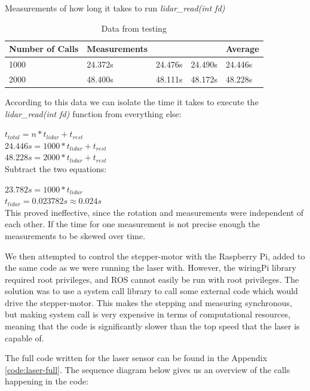 Measurements of how long it takes to run \textit{lidar\_read(int fd)}

\begin{table}[H]
	\centering
	\begin{tabular}{|l|l|l|l|l|} \hline
            Number of Calls & Measurements & & & Average \\ \hline
            1000 & 24.372s & 24.476s & 24.490s & 24.446s \\ \hline
            2000 & 48.400s & 48.111s & 48.172s & 48.228s \\ \hline
	\end{tabular}
	\caption{Data from testing}
\end{table}

According to this data we can isolate the time it takes to execute the \textit{lidar\_read(int fd)} function from everything else:

$t_{total} = n*t_{lidar} + t_{rest}$ \\

$24.446s = 1000*t_{lidar} + t_{rest}$ \\
$48.228s = 2000*t_{lidar} + t_{rest}$ \\

Subtract the two equations:

$23.782s = 1000*t_{lidar}$ \\
$t_{lidar} = 0.023782s \approx 0.024s$ \\


This proved ineffective, since the rotation and measurements were independent of each other. If the time for one measurement is not precise enough the measurements to be skewed over time.

We then attempted to control the stepper-motor with the Raspberry Pi, added to the same code as we were running the laser with. However, the wiringPi library required root privileges, and ROS cannot easily be run with root privileges. The solution was to use a system call library to call some external code which would drive the stepper-motor. This makes the stepping and measuring synchronous, but making system call is very expensive in terms of computational resources, meaning that the code is significantly slower than the top speed that the laser is capable of.

The full code written for the laser sensor can be found in the Appendix \ref{code:laser-full}. The sequence diagram below gives us an overview of the calls happening in the code:

